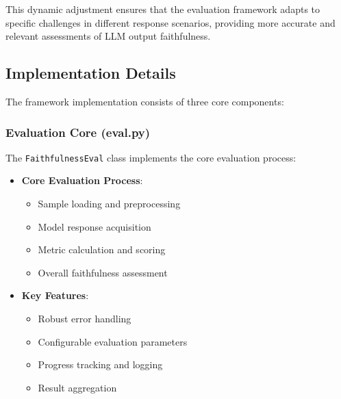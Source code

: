 This dynamic adjustment ensures that the evaluation framework adapts to specific challenges in different response scenarios, providing more accurate and relevant assessments of LLM output faithfulness.

\subsection{Implementation Details}
The framework implementation consists of three core components:

\subsubsection{Evaluation Core (eval.py)}
The \texttt{FaithfulnessEval} class implements the core evaluation process:
\begin{itemize}
    \item \textbf{Core Evaluation Process}:
    \begin{itemize}
        \item Sample loading and preprocessing
        \item Model response acquisition
        \item Metric calculation and scoring
        \item Overall faithfulness assessment
    \end{itemize}
    \item \textbf{Key Features}:
    \begin{itemize}
        \item Robust error handling
        \item Configurable evaluation parameters
        \item Progress tracking and logging
        \item Result aggregation
    \end{itemize}
\end{itemize}

